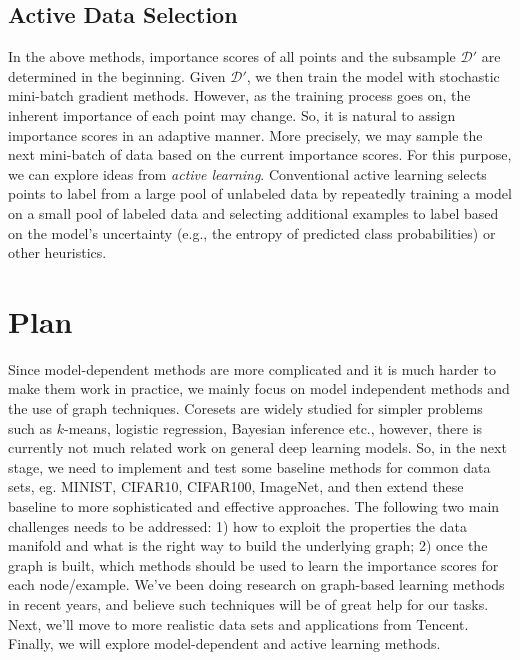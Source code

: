 \documentclass[12pt]{article}
\newcommand{\D}      {\mathcal{D}}
\begin{document}
\subsection{Active Data Selection}
In the above methods, importance scores of all points and the subsample $\D'$ are determined in the beginning. Given $\D'$, we then train the model with stochastic mini-batch gradient methods. However, as the training process goes on, the inherent importance of each point may change. So, it is natural to assign importance scores in an adaptive manner. More precisely, we may sample the next mini-batch of data based on the current importance scores.  For this purpose, we can explore ideas from \emph{active learning}.
Conventional active learning selects points to label from a large pool of unlabeled data by repeatedly training a model on a small pool of labeled data and selecting additional examples to label based on the model’s uncertainty (e.g., the entropy of predicted class probabilities) or other heuristics. 

\section{Plan}
Since model-dependent methods are more complicated and it is much harder to make them work in practice, we mainly focus on model independent methods and the use of graph techniques. Coresets are widely studied for simpler problems such as $k$-means, logistic regression, Bayesian inference  etc., however, there is currently not much related work on general deep learning models. So, in the next stage, we need to implement and test some baseline methods for common data sets, eg. MINIST, CIFAR10, CIFAR100, ImageNet, and then extend these baseline to more sophisticated and effective approaches. The following two main challenges needs to be addressed: 1) how to exploit the properties the data manifold and what is the right way to build the underlying graph; 2) once the graph is built, which methods should be used to learn the importance scores for each node/example. We've been doing research on graph-based learning methods in recent years, and believe  such techniques will be of great help for our tasks. Next, we'll move to more realistic data sets and applications from Tencent. Finally, we will explore model-dependent and active learning methods.
 

%
%
%

\end{document}
